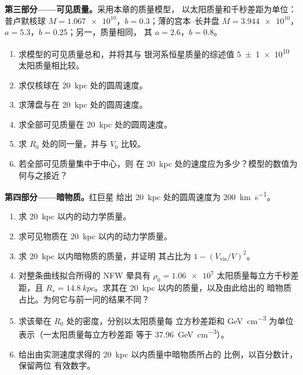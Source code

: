 \begin{problem}
\medskip\noindent\textbf{第三部分——可见质量。}采用本章的质量模型，
以太阳质量和千秒差距为单位：
普卢默核球 $M = \num{1.067e10}$，$b = 0.3$；薄的宫本–长井盘
$M = \num{3.944e10}$，$a = 5.3$，$b = 0.25$；另一，质量相同，
其 $a = 2.6$，$b = 0.8$。
\begin{enumerate}[resume]
\item 求模型的可见质量总和，并将其与
  银河系恒星质量的综述值 \qty[separate-uncertainty=true]{5 \pm 1 e10}{}
  太阳质量相比较。
\item 求仅核球在 \qty{20}{kpc} 处的圆周速度。
\item 求薄盘与在 \qty{20}{kpc} 处的圆周速度。
\item 求全部可见质量在
  \qty{20}{kpc} 处的圆周速度。
\item 求 $R_0$ 处的同一量，并与 $V_0$ 比较。
\item 若全部可见质量集中于中心，则
  在 \qty{20}{kpc} 处的速度应为多少？模型的数值为何与之接近？
\end{enumerate}

\medskip\noindent\textbf{第四部分——暗物质。}红巨星
给出 \qty{20}{kpc} 处的圆周速度为 \qty{200}{km.s^{-1}}。
\begin{enumerate}[resume]
\item 求 \qty{20}{kpc} 以内的动力学质量。
\item 求可见物质在
  \qty{20}{kpc} 以内的动力学质量。
\item 求 \qty{20}{kpc} 以内暗物质的质量，并证明
  其占比为 $1 - (V_\mathrm{vis}/V)^2$。
\item 对整条曲线拟合所得的 NFW 晕具有
  $\rho_0 = \num{1.06e7}$ 太阳质量每立方千秒差距，且
  $R_s = \qty{14.8}{kpc}$。求其在 \qty{20}{kpc} 以内的质量，以及由此给出的
  暗物质占比。为何它与前一问的结果不同？
\item 求该晕在 $R_0$ 处的密度，分别以太阳质量每
  立方秒差距和 \unit{GeV.cm^{-3}} 为单位表示（一太阳质量每立方秒差距
  等于 \qty{37.96}{GeV.cm^{-3}}）。
\item 给出由实测速度求得的 \qty{20}{kpc} 以内质量中暗物质所占的
  比例，以百分数计，保留两位
  有效数字。
\end{enumerate}
\end{problem}
